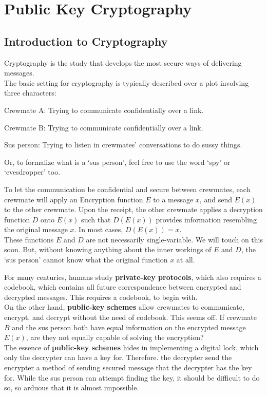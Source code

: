 \chapter{Public Key Cryptography}

\section{Introduction to Cryptography}
Cryptography is the study that develops the most secure ways of delivering messages. \\
The basic setting for cryptography is typically described over a plot involving three characters:
\begin{bindenum}
    \item Crewmate A: Trying to communicate confidentially over a link.
    \item Crewmate B: Trying to communicate confidentially over a link.
    \item Sus person: Trying to listen in crewmates' conversations to do sussy things.
\end{bindenum}
Or, to formalize what is a `sus person', feel free to use the word `spy' or `evesdropper' too.

To let the communication be confidential and secure between crewmates, each crewmate will apply an Encryption function $E$ to a message $x$, and send $E(x)$ to the other crewmate.
Upon the receipt, the other crewmate applies a decryption function $D$ onto $E(x)$ such that $D(E(x))$ provides information resembling the original message $x$. In most cases, $D(E(x)) = x$. \\
These functions $E$ and $D$ are not necessarily single-variable. We will touch on this soon. But, without knowing anything about the inner workings of $E$ and $D$, the `sus person' cannot know what the original function $x$ at all.

For many centuries, humans study \textbf{private-key protocols}, which also requires a codebook, which contains all future correspondence between encrypted and decrypted messages. This requires a codebook, to begin with. \\
On the other hand, \textbf{public-key schemes} allow crewmates to communicate, encrypt, and decrypt without the need of codebook. This seems off. If crewmate $B$ and the sus person both have equal information on the encrypted message $E(x)$, are they not equally capable of solving the encryption? \\
The essence of \textbf{public-key schemes} hides in implementing a digital lock, which only the decrypter can have a key for. Therefore. the decrypter send the encrypter a method of sending secured message that the decrypter has the key for. While the sus person can attempt finding the key, it should be difficult to do so, so arduous that it is almost impossible.


